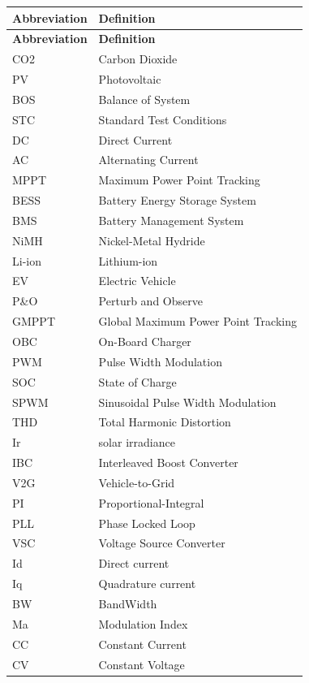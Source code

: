 \renewcommand{\arraystretch}{1.2}


\begin{longtable}{p{3cm}p{11cm}}

\textbf{Abbreviation} & \textbf{Definition} \\ \hline
\endfirsthead

\textbf{Abbreviation} & \textbf{Definition} \\ \hline
\endhead
CO2  & Carbon Dioxide \\
PV   & Photovoltaic \\
BOS  & Balance of System \\
STC  & Standard Test Conditions \\
DC   & Direct Current \\
AC   & Alternating Current \\
MPPT & Maximum Power Point Tracking \\
BESS  & Battery Energy Storage System \\
BMS  & Battery Management System \\
NiMH  & Nickel-Metal Hydride \\
Li-ion & Lithium-ion \\
EV   & Electric Vehicle \\
P\&O  & Perturb and Observe  \\
GMPPT & Global Maximum Power Point Tracking  \\
OBC  & On-Board Charger \\
PWM  & Pulse Width Modulation \\
SOC  & State of Charge \\
SPWM & Sinusoidal Pulse Width Modulation \\
THD  & Total Harmonic Distortion \\
Ir   & solar irradiance  \\
IBC  & Interleaved Boost Converter  \\
V2G  & Vehicle-to-Grid  \\
PI   & Proportional-Integral  \\
PLL  & Phase Locked Loop  \\
VSC  & Voltage Source Converter  \\
Id   & Direct current  \\
Iq   & Quadrature current  \\
BW   & BandWidth  \\
Ma   & Modulation Index  \\
CC   & Constant Current  \\
CV   & Constant Voltage  \\

\end{longtable}
